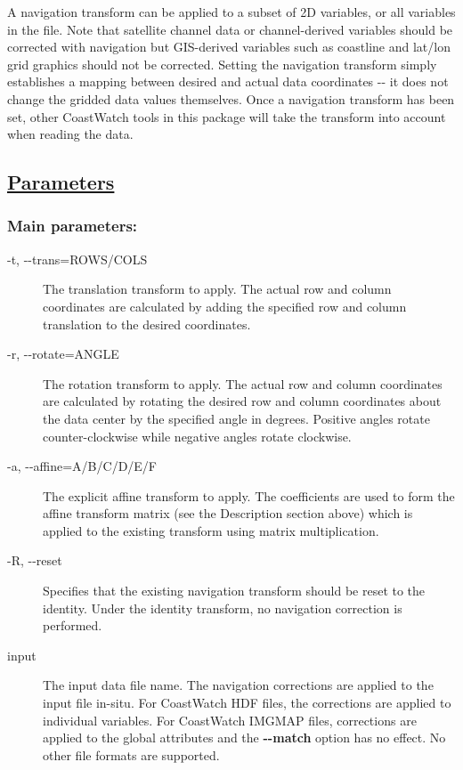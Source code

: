  A navigation transform can be applied to a subset of 2D variables, or all variables in the file. Note that satellite channel data or channel-derived variables should be corrected with navigation but GIS-derived variables such as coastline and lat/lon grid graphics should not be corrected. Setting the navigation transform simply establishes a mapping between desired and actual data coordinates -{-} it does not change the gridded data values themselves. Once a navigation transform has been set, other CoastWatch tools in this package will take the transform into account when reading the data. 
\subsection*{\underline{Parameters}}
\subsubsection*{Main parameters:}
\begin{description}
\item[ -t, -{-}trans=ROWS/COLS ] The translation transform to apply. The actual row and column coordinates are calculated by adding the specified row and column translation to the desired coordinates. 
\item[ -r, -{-}rotate=ANGLE ] The rotation transform to apply. The actual row and column coordinates are calculated by rotating the desired row and column coordinates about the data center by the specified angle in degrees. Positive angles rotate counter-clockwise while negative angles rotate clockwise.
\item[ -a, -{-}affine=A/B/C/D/E/F ] The explicit affine transform to apply. The coefficients are used to form the affine transform matrix (see the Description section above) which is applied to the existing transform using matrix multiplication. 
\item[ -R, -{-}reset ] Specifies that the existing navigation transform should be reset to the identity. Under the identity transform, no navigation correction is performed.
\item[ input ] The input data file name. The navigation corrections are applied to the input file in-situ. For CoastWatch HDF files, the corrections are applied to individual variables. For CoastWatch IMGMAP files, corrections are applied to the global attributes and the \textbf{-{-}match}
 option has no effect. No other file formats are supported.

\end{description}
